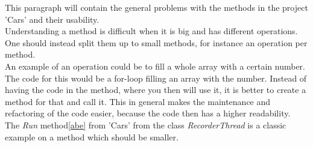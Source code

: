 This paragraph will contain the general problems with the methods in the project 'Cars' and their usability.
\\
Understanding a method is difficult when it is big and has different operations.
One should instead split them up to small methods, for instance an operation per method.
\\
An example of an operation could be to fill a whole array with a certain number.
The code for this would be a for-loop filling an array with the number.
Instead of having the code in the method, where you then will use it, it is better to create a method for that and call it.
This in general makes the maintenance and refactoring of the code easier, because the code then has a higher readability.
\\
The \textit{Run} method\cref{abe} from 'Cars' from the class \textit{RecorderThread} is a classic example on a method which should be smaller.